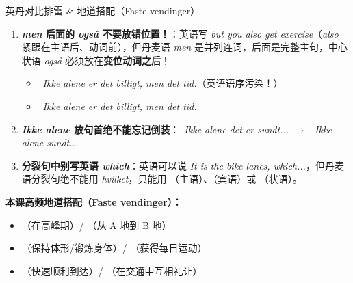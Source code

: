 \begin{grammatikbox}{英丹对比排雷 \& 地道搭配（Faste vendinger）}
\begin{enumerate}
  \item \textbf{\textit{men} 后面的 \textit{også} 不要放错位置！}：英语写 \textit{but you also get exercise}（\textit{also} 紧跟在主语后、动词前），但丹麦语 \textit{men} 是并列连词，后面是完整主句，中心状语 \textit{også} 必须放在\textbf{变位动词之后}！
    \begin{itemize}
      \item {}\ \textit{Ikke alene er det billigt, men det  tid.}（英语语序污染！）
      \item {}\ \textit{Ikke alene er det billigt, men det  tid.}
    \end{itemize}
  \item \textbf{\textit{Ikke alene} 放句首绝不能忘记倒装}：\ \textit{Ikke alene det er sundt...} $\rightarrow$ \ \textit{Ikke alene  sundt...}
  \item \textbf{分裂句中别写英语 \textit{which}}：英语可以说 \textit{It is the bike lanes, which...}，但丹麦语分裂句绝不能用 \textit{hvilket}，只能用 （主语）、（宾语）或 （状语）。
\end{enumerate}

\textbf{本课高频地道搭配（Faste vendinger）：}
\begin{itemize}
  \item {}（在高峰期）/ （从 A 地到 B 地）
  \item {}（保持体形/锻炼身体）/ （获得每日运动）
  \item {}（快速顺利到达）/ （在交通中互相礼让）
\end{itemize}
\end{grammatikbox}


